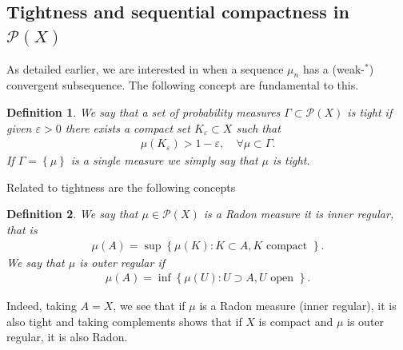 \documentclass[
    a4paper,
    DIV=14,
    abstract=true,
    numbers=noenddot
]
{scrartcl}
\newtheorem{definition}[definition]{Definition}
\theoremstyle{definition}
\newcommand{\eps}{\varepsilon}
\newcommand{\set}[1]{\left\{#1\right\}}
\newcommand{\Pp}{\mathcal{P}}
\begin{document}
\subsection{Tightness and sequential compactness in $\Pp (X)$ }
As detailed earlier, we are interested in when a sequence $\mu_n$ has a (weak-$^*$) convergent subsequence. The following concept are fundamental to this.
\begin{definition}\label{tight def}
    We say that a set of probability measures $\Gamma \subset \Pp (X)$ is tight if given $\eps >0$ there exists a compact set $K_\eps \subset X$ such that
    \begin{align*}
        \mu (K_\eps )>1- \eps , \quad\forall \mu \subset \Gamma.
    \end{align*}
    If $\Gamma = \set{\mu}$ is a single measure we simply say that $\mu $ is tight.
\end{definition}
Related to tightness are the following concepts
\begin{definition}\label{regularity def}
    We say that $\mu \in  \Pp (X)$ is a Radon measure it is \emph{inner regular}, that is
    \begin{align*}
        \mu (A)= \sup \set{ \mu (K): K \subset A, K \text{ compact } }.
    \end{align*}
    We say that $\mu $ is \emph{outer regular} if
    \begin{align*}
        \mu (A)= \inf \set{ \mu (U): U \supset A, U \text{ open } }.
    \end{align*}
\end{definition}
Indeed, taking $A =X$, we see that if $\mu$ is a Radon measure (inner regular), it is also tight and taking complements shows that if $X$ is compact and $\mu $ is outer regular, it is also Radon.
\end{document}
